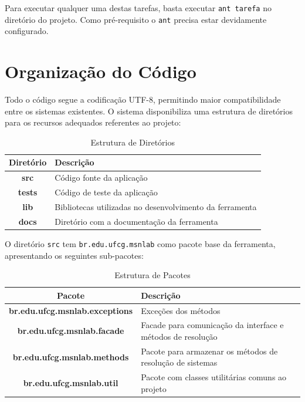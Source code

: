 \documentclass[a4paper,10pt]{report}
\begin{document}
Para executar qualquer uma destas tarefas, basta executar \texttt{ant tarefa} no diretório do projeto. Como pré-requisito o \texttt{ant} precisa estar devidamente configurado.

\section{Organização do Código}

Todo o código segue a codificação UTF-8, permitindo maior compatibilidade entre os sistemas existentes. O sistema disponibiliza uma estrutura de diretórios para os recursos adequados referentes ao projeto:

\begin{table}[h]
\centering
\caption{Estrutura de Diretórios}
        \begin{tabular}{|c|p{2in}|}
        \hline
        \textbf{Diretório} & \textbf{Descrição} \\ \hline
        \textbf{src} & Código fonte da aplicação \\ \hline
        \textbf{tests} & Código de teste da aplicação \\ \hline
        \textbf{lib} & Bibliotecas utilizadas no desenvolvimento da ferramenta \\ \hline
        \textbf{docs} & Diretório com a documentação da ferramenta \\ \hline
        \end{tabular}
\label{tab:diretorios}
\end{table} 

O diretório \texttt{src} tem \texttt{br.edu.ufcg.msnlab} como pacote base da ferramenta, apresentando os seguintes sub-pacotes:

\begin{table}[h]
\centering
\caption{Estrutura de Pacotes}
        \begin{tabular}{|c|p{2in}|}
        \hline
        \textbf{Pacote} & \textbf{Descrição} \\ \hline
        \textbf{br.edu.ufcg.msnlab.exceptions} & Exceções dos métodos \\ \hline
        \textbf{br.edu.ufcg.msnlab.facade} & Facade para comunicação da interface e métodos de resolução \\ \hline
        \textbf{br.edu.ufcg.msnlab.methods} & Pacote para armazenar os métodos de resolução de sistemas \\ \hline
        \textbf{br.edu.ufcg.msnlab.util} & Pacote com classes utilitárias comuns ao projeto \\ \hline
        \end{tabular}
\label{tab:pacotes}
\end{table} 
\end{document}
